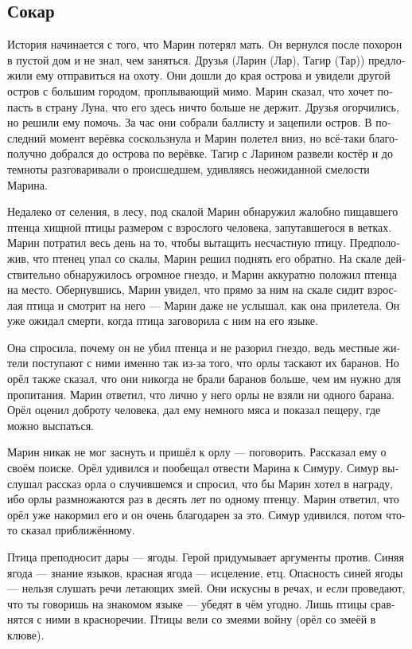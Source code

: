 \documentclass[a4paper,12pt,fleqn]{book}\usepackage{cooltooltips}\usepackage{polyglossia}\setdefaultlanguage[babelshorthands=true]{russian}\setotherlanguage{english}\defaultfontfeatures{Ligatures=TeX,Mapping=tex-text} \usepackage{xcolor}\definecolor{lightgray}{HTML}{bbbbbb}\color{lightgray}\newcommand{\ml}[3]{\textenglish{\textcolor{black}{#3}}}
\begin{document}
{\subsection{Сокар}

История начинается с того, что Марин потерял мать.
Он вернулся после похорон в пустой дом и не знал, чем заняться.
Друзья (Ларин (Лар), Тагир (Тар)) предложили ему отправиться на охоту.
Они дошли до края острова и увидели другой остров с большим городом, проплывающий мимо.
Марин сказал, что хочет попасть в страну Луна, что его здесь ничто больше не держит.
Друзья огорчились, но решили ему помочь.
За час они собрали баллисту и зацепили остров.
В последний момент верёвка соскользнула и Марин полетел вниз, но всё-таки благополучно добрался до острова по верёвке.
Тагир с Ларином развели костёр и до темноты разговаривали о происшедшем, удивляясь неожиданной смелости Марина.

Недалеко от селения, в лесу, под скалой Марин обнаружил жалобно пищавшего птенца хищной птицы размером с взрослого человека, запутавшегося в ветках.
Марин потратил весь день на то, чтобы вытащить несчастную птицу.
Предположив, что птенец упал со скалы, Марин решил поднять его обратно.
На скале действительно обнаружилось огромное гнездо, и Марин аккуратно положил птенца на место.
Обернувшись, Марин увидел, что прямо за ним на скале сидит взрослая птица и смотрит на него --- Марин даже не услышал, как она прилетела.
Он уже ожидал смерти, когда птица заговорила с ним на его языке.

Она спросила, почему он не убил птенца и не разорил гнездо, ведь местные жители поступают с ними именно так из-за того, что орлы таскают их баранов.
Но орёл также сказал, что они никогда не брали баранов больше, чем им нужно для пропитания.
Марин ответил, что лично у него орлы не взяли ни одного барана.
Орёл оценил доброту человека, дал ему немного мяса и показал пещеру, где можно выспаться.

Марин никак не мог заснуть и пришёл к орлу --- поговорить.
Рассказал ему о своём поиске.
Орёл удивился и пообещал отвести Марина к Симуру.
Симур выслушал рассказ орла о случившемся и спросил, что бы Марин хотел в награду, ибо орлы размножаются раз в десять лет по одному птенцу.
Марин ответил, что орёл уже накормил его и он очень благодарен за это.
Симур удивился, потом что-то сказал приближённому.

Птица преподносит дары --- ягоды.
Герой придумывает аргументы против.
Синяя ягода --- знание языков, красная ягода --- исцеление, етц.
Опасность синей ягоды --- нельзя слушать речи летающих змей.
Они искусны в речах, и если проведают, что ты говоришь на знакомом языке --- убедят в чём угодно.
Лишь птицы сравнятся с ними в красноречии.
Птицы вели со змеями войну (орёл со змеёй в клюве).

}
\end{document}
